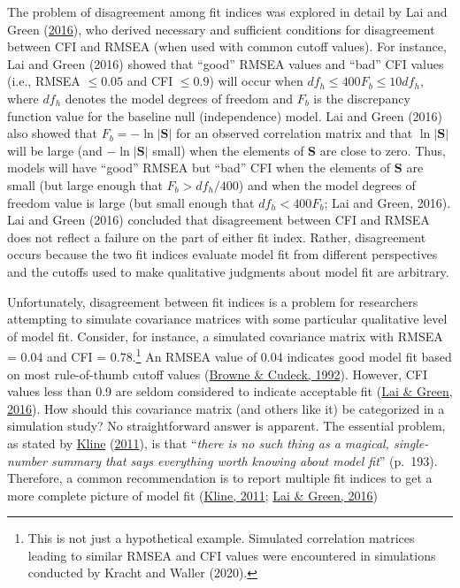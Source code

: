 \documentclass[11pt]{umnthesis}
\begin{document}
The problem of disagreement among fit indices was explored in detail by Lai and Green (\protect\hyperlink{ref-lai2016}{2016}), who derived necessary and sufficient conditions for disagreement between CFI and RMSEA (when used with common cutoff values). For instance, Lai and Green (2016) showed that ``good'' RMSEA values and ``bad'' CFI values (i.e., RMSEA \(\leq 0.05\) and CFI \(\leq 0.9\)) will occur when \(df_h \leq 400 F_b \leq 10 df_h\), where \(df_h\) denotes the model degrees of freedom and \(F_b\) is the discrepancy function value for the baseline null (independence) model. Lai and Green (2016) also showed that \(F_b = -\ln |\mathbf{S}|\) for an observed correlation matrix and that \(\ln |\mathbf{S}|\) will be large (and \(-\ln |\mathbf{S}|\) small) when the elements of \(\mathbf{S}\) are close to zero. Thus, models will have ``good'' RMSEA but ``bad'' CFI when the elements of \(\mathbf{S}\) are small (but large enough that \(F_b > df_h / 400\)) and when the model degrees of freedom value is large (but small enough that \(df_h < 400 F_b\); Lai and Green, 2016). Lai and Green (2016) concluded that disagreement between CFI and RMSEA does not reflect a failure on the part of either fit index. Rather, disagreement occurs because the two fit indices evaluate model fit from different perspectives and the cutoffs used to make qualitative judgments about model fit are arbitrary.

Unfortunately, disagreement between fit indices is a problem for researchers attempting to simulate covariance matrices with some particular qualitative level of model fit. Consider, for instance, a simulated covariance matrix with RMSEA = 0.04 and CFI = 0.78.\footnote{This is not just a hypothetical example. Simulated correlation matrices leading to similar RMSEA and CFI values were encountered in simulations conducted by Kracht and Waller (2020).} An RMSEA value of 0.04 indicates good model fit based on most rule-of-thumb cutoff values (\protect\hyperlink{ref-browne1992}{Browne \& Cudeck, 1992}). However, CFI values less than 0.9 are seldom considered to indicate acceptable fit (\protect\hyperlink{ref-lai2016}{Lai \& Green, 2016}). How should this covariance matrix (and others like it) be categorized in a simulation study? No straightforward answer is apparent. The essential problem, as stated by \protect\hyperlink{ref-kline2011}{Kline} (\protect\hyperlink{ref-kline2011}{2011}), is that ``\emph{there is no such thing as a magical, single-number summary that says everything worth knowing about model fit}'' (p.~193). Therefore, a common recommendation is to report multiple fit indices to get a more complete picture of model fit (\protect\hyperlink{ref-kline2011}{Kline, 2011}; \protect\hyperlink{ref-lai2016}{Lai \& Green, 2016})
\end{document}
